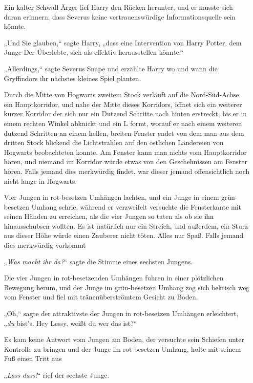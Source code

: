 {Ein kalter Schwall Ärger lief Harry den Rücken herunter, und er musste sich daran erinnern, dass Severus keine vertrauenswürdige Informationsquelle sein könnte.

„Und Sie glauben,“ sagte Harry, „dass eine Intervention von Harry Potter, dem Junge-Der-Überlebte, sich als effektiv herausstellen könnte.“

„Allerdings,“ sagte Severus Snape und erzählte Harry wo und wann die Gryffindors ihr nächstes kleines Spiel planten.

Durch die Mitte von Hogwarts zweitem Stock verläuft auf die Nord-Süd-Achse ein Hauptkorridor, und nahe der Mitte dieses Korridors, öffnet sich ein weiterer kurzer Korridor der sich nur ein Dutzend Schritte nach hinten erstreckt, bis er in einem rechten Winkel abknickt und ein L formt, worauf er nach einem weiteren dutzend Schritten an einem hellen, breiten Fenster endet von dem man aus dem dritten Stock blickend die Lichtstrahlen auf den östlichen Ländereien von Hogwarts beobachteten konnte. Am Fenster kann man nichts vom Hauptkorridor hören, und niemand im Korridor würde etwas von den Geschehnissen am Fenster hören. Falls jemand dies merkwürdig findet, war dieser jemand offensichtlich noch nicht lange in Hogwarts.

Vier Jungen in rot-besetzen Umhängen lachten, und ein Junge in einem grün-besetzen Umhang schrie, während er verzweifelt versuchte die Fensterkante mit seinen Händen zu erreichen, als die vier Jungen so taten als ob sie ihn hinausschubsen wollten. Es ist natürlich nur ein Streich, und außerdem, ein Sturz aus dieser Höhe würde einen Zauberer nicht töten. Alles nur Spaß. Falls jemand dies merkwürdig vorkommt \later

„\emph{Was macht ihr da?}“ sagte die Stimme eines sechsten Jungens.

Die vier Jungen in rot-besetzenden Umhängen fuhren in einer plötzlichen Bewegung herum, und der Junge im grün-besetzen Umhang zog sich hektisch weg vom Fenster und fiel mit tränenüberströmtem Gesicht zu Boden.

„Oh,“ sagte der attraktivste der Jungen in rot-besetzen Umhängen erleichtert, „\emph{du} bist's. Hey Lessy, weißt du wer das ist?“

Es kam keine Antwort vom Jungen am Boden, der versuchte sein Schiefen unter Kontrolle zu bringen und der Junge im rot-besetzen Umhang, holte mit seinem Fuß einen Tritt aus \later

„\emph{Lass dass!}“ rief der sechste Junge.

}
